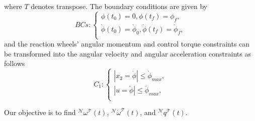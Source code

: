 \documentclass[journal ]{new-aiaa}
\begin{document}
	where $T$ denotes transpose. The boundary conditions are given by
	\begin{equation}\label{Bcs}
	BCs:\left\{
	\begin{array}{l}
	\phi(t_0)=0, \phi(t_f)=\phi_{f},\\
	\dot{\phi}(t_0)=\dot{\phi}_{0},\dot{ \phi}(t_f)=\dot{\phi}_{f}, \\
	\end{array}
	\right.
	\end{equation}
	and the reaction wheels' angular momentum and control torque constraints can be transformed into the angular velocity and angular acceleration constraints as follows
	\begin{equation}\label{constraints1}
	C_1:\left\{
	\begin{array}{l}
	|x_2=\dot{\phi}|\leq \dot{\phi}_{max},\\
	|u=\ddot{\phi}|\leq \ddot{\phi}_{max},\\
	\end{array}
	\right.
	\end{equation}
	
	
	
Our objective is to find $^\mathcal{N}\omega^\mathcal{T}(t)$, $^\mathcal{N}\dot{\omega}^\mathcal{T}(t)$, and $^\mathcal{N}q^\mathcal{T}(t)$.\\
	
	
\end{document}
